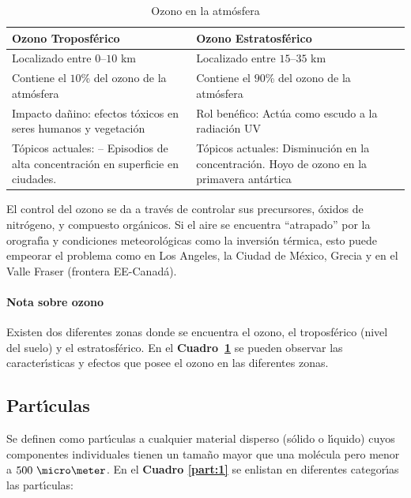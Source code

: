\begin{table}[hbt]
\caption{Ozono en la atm\'osfera}
\label{ozon:1}
\begin{center}
{\footnotesize \begin{tabularx}{.9\textwidth}{X|X}
\textbf{Ozono Troposf\'erico}&\textbf{Ozono Estratosf\'erico}\\ \hline \hline
Localizado entre $0$--$10$ km& Localizado entre $15$--$35$ km\\
Contiene el $10$\% del ozono de la atm\'osfera&
Contiene el $90$\% del ozono de la atm\'osfera\\
Impacto da\~nino: efectos t\'oxicos en seres humanos y vegetaci\'on&
Rol ben\'efico: Act\'ua como escudo a la radiaci\'on UV\\
T\'opicos actuales: -- Episodios de alta concentraci\'on en superficie en ciudades.&
T\'opicos actuales: Disminuci\'on en la concentraci\'on. Hoyo de ozono en la
primavera ant\'artica\\\hline
\end{tabularx}}
\end{center}
\end{table}

El control del ozono se da a trav\'es de controlar sus precursores, \'oxidos de nitr\'ogeno, y compuesto org\'anicos. Si el aire se encuentra ``atrapado'' por la
orograf\'{\i}a y condiciones meteorol\'ogicas como la inversi\'on t\'ermica, esto puede empeorar el problema como en  Los Angeles, la Ciudad de M\'exico, Grecia y en el Valle Fraser (frontera EE-Canad\'a).

\paragraph{Nota sobre ozono}
Existen dos diferentes zonas donde se encuentra el ozono, el troposf\'erico (nivel del suelo) y el estratosf\'erico. En el \textbf{Cuadro~\ref{ozon:1}} se pueden observar las
caracter\'{\i}sticas y efectos que posee el ozono en las diferentes zonas.



\subsection{Part\'{\i}culas}
Se definen como part\'{\i}culas a cualquier material disperso (s\'olido o l\'{\i}quido) cuyos componentes individuales tienen un tama\~no mayor que una mol\'e\-cula pero menor a $500\ \micro\meter$.  En el \textbf{Cuadro \ref{part:1}}  se enlistan en diferentes categor\'{\i}as las part\'{\i}culas:

